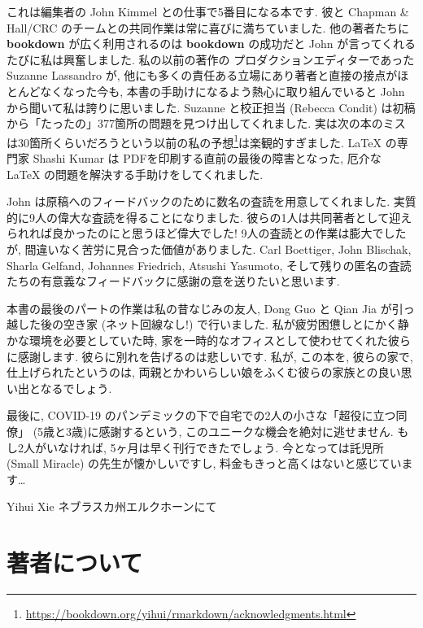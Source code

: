 \documentclass[
  11pt,
]{bxjsreport}
\renewcommand{\href}[2]{#2\footnote{\url{#1}}}
\begin{document}
これは編集者の John Kimmel との仕事で5番目になる本です. 彼と Chapman \& Hall/CRC のチームとの共同作業は常に喜びに満ちていました. 他の著者たちに \textbf{bookdown} が広く利用されるのは \textbf{bookdown} の成功だと John が言ってくれるたびに私は興奮しました. 私の以前の著作の プロダクションエディターであった Suzanne Lassandro が, 他にも多くの責任ある立場にあり著者と直接の接点がほとんどなくなった今も, 本書の手助けになるよう熱心に取り組んでいると John から聞いて私は誇りに思いました. Suzanne と校正担当 (Rebecca Condit) は初稿から「たったの」377箇所の問題を見つけ出してくれました. 実は次の本のミスは30箇所くらいだろうという\href{https://bookdown.org/yihui/rmarkdown/acknowledgments.html}{以前の私の予想}は楽観的すぎました. LaTeX の専門家 Shashi Kumar は PDFを印刷する直前の最後の障害となった, 厄介な LaTeX の問題を解決する手助けをしてくれました.

John は原稿へのフィードバックのために数名の査読を用意してくれました. 実質的に9人の偉大な査読を得ることになりました. 彼らの1人は共同著者として迎えられれば良かったのにと思うほど偉大でした! 9人の査読との作業は膨大でしたが, 間違いなく苦労に見合った価値がありました. Carl Boettiger, John Blischak, Sharla Gelfand, Johannes Friedrich, Atsushi Yasumoto, そして残りの匿名の査読たちの有意義なフィードバックに感謝の意を送りたいと思います.

本書の最後のパートの作業は私の昔なじみの友人, Dong Guo と Qian Jia が引っ越した後の空き家 (ネット回線なし!) で行いました. 私が疲労困憊しとにかく静かな環境を必要としていた時, 家を一時的なオフィスとして使わせてくれた彼らに感謝します. 彼らに別れを告げるのは悲しいです. 私が, この本を, 彼らの家で, 仕上げられたというのは, 両親とかわいらしい娘をふくむ彼らの家族との良い思い出となるでしょう.

最後に, COVID-19 のパンデミックの下で自宅での2人の小さな「超役に立つ同僚」 (5歳と3歳)に感謝するという, このユニークな機会を絶対に逃せません. もし2人がいなければ, 5ヶ月は早く刊行できたでしょう. 今となっては託児所 (Small Miracle) の先生が懐かしいですし, 料金もきっと高くはないと感じています\ldots{}

\begin{flushright}
Yihui Xie ネブラスカ州エルクホーンにて

\end{flushright}

\hypertarget{author}{%
\chapter*{著者について}\label{author}}
\end{document}
